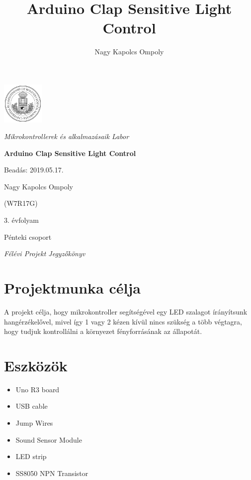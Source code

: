 \documentclass[a4paper,11pt]{article}
\author{Nagy Kapolcs Ompoly}
\title{Arduino Clap Sensitive Light Control}
\date{ }
\begin{document}
\begin{titlepage}
	\centering
	\includegraphics[width=0.15\textwidth]{eltecimer.jpg}\par
	\vspace{1cm}
	{\Large\itshape Mikrokontrollerek és alkalmazásaik Labor\par}
	{\huge\bfseries Arduino Clap Sensitive Light Control\par}
	
	\vfill
	
	\raggedleft
	Beadás: 2019.05.17.\par
	\vspace{0.5cm}
	Nagy Kapolcs Ompoly\par
	(W7R17G)\par
	3. évfolyam\par
	Pénteki csoport\par
	
	\vspace{0.5cm}

	\centering
	{\small\itshape Félévi Projekt Jegyzőkönyv \par}
\end{titlepage}
\clearpage
\setcounter{page}{1}
\newpage
\renewcommand{\thesection}{\Roman{section}}
\renewcommand{\thesubsection}{\thesection.\arabic{subsection}}
\renewcommand{\thesubsubsection}{\thesubsection.\arabic{subsubsection}}
\section{Projektmunka célja}
A projekt célja, hogy mikrokontroller segítségével egy LED szalagot írányítsunk hangérzékelővel, mivel így 1 vagy 2 kézen kívül nincs szükség a több végtagra, hogy tudjuk kontrollálni a környezet fényforrásának az állapotát.

\section{Eszközök}

\begin{itemize}
	\item Uno R3 board 
	\item USB cable
	\item Jump Wires
	\item Sound Sensor Module 
	\item LED strip
	\item SS8050 NPN Transistor
\end{itemize}
\end{document}
